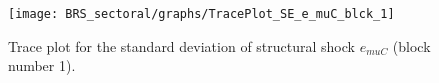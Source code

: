 \begin{figure}[H]
\centering
  \texttt{[image: BRS\_sectoral/graphs/TracePlot\_SE\_e\_muC\_blck\_1]}\\
    \caption{Trace plot for the standard deviation of structural shock ${e_{muC}}$ (block number 1).}
\end{figure}
